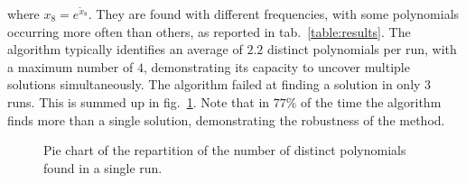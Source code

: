 \documentclass[11pt,a4paper]{article}
\begin{document}
	where $x_{8} = e^{\tilde{x}_{8}}$. They are found with different frequencies, with some polynomials occurring more often than others, as reported in tab.~\ref{table:results}. The algorithm typically identifies an average of $2.2$ distinct polynomials per run, with a maximum number of $4$, demonstrating its capacity to uncover multiple solutions simultaneously. The algorithm failed at finding a solution in only 3 runs. This is summed up in fig.~\ref{fig:piechart}. Note that in $77\%$ of the time the algorithm finds more than a single solution, demonstrating the robustness of the method.

	\begin{figure}
		\centering
		
		\caption{Pie chart of the repartition of the number of distinct polynomials found in a single run.}
		\label{fig:piechart}
	\end{figure}
\end{document}
